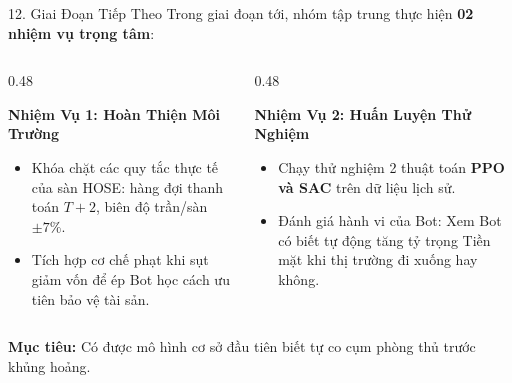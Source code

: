\documentclass[aspectratio=169, 10pt]{beamer}
\begin{document}
\begin{frame}{12. Giai Đoạn Tiếp Theo}
  Trong giai đoạn tới, nhóm tập trung thực hiện \textbf{02 nhiệm vụ trọng tâm}:

  \vspace{1.5ex}
  \begin{columns}[t]
    \begin{column}{0.48\textwidth}
      \begin{block}{\textbf{Nhiệm Vụ 1: Hoàn Thiện Môi Trường}}
        \small
        \begin{itemize}
          \item Khóa chặt các quy tắc thực tế của sàn HOSE: hàng đợi thanh toán $T+2$, biên độ trần/sàn $\pm 7\%$.
          \item Tích hợp cơ chế phạt khi sụt giảm vốn để ép Bot học cách ưu tiên bảo vệ tài sản.
        \end{itemize}
      \end{block}
    \end{column}

    \begin{column}{0.48\textwidth}
      \begin{block}{\textbf{Nhiệm Vụ 2: Huấn Luyện Thử Nghiệm}}
        \small
        \begin{itemize}
          \item Chạy thử nghiệm 2 thuật toán \textbf{PPO và SAC} trên dữ liệu lịch sử.
          \item Đánh giá hành vi của Bot: Xem Bot có biết tự động tăng tỷ trọng Tiền mặt khi thị trường đi xuống hay không.
        \end{itemize}
      \end{block}
    \end{column}
  \end{columns}

  \vspace{1.5ex}
  \begin{center}
    \footnotesize \color{SecondaryNavy}\textbf{Mục tiêu:} Có được mô hình cơ sở đầu tiên biết tự co cụm phòng thủ trước khủng hoảng.
  \end{center}
\end{frame}
\end{document}
